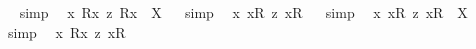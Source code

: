 \begin{isabellebody}
\isadelimproof
\ %
\endisadelimproof
%
\isatagproof
{}\isamarkupfalse%
\ {\isacharparenleft}simp{\isacharparenright}\ \isamarkupfalse%
%
\endisatagproof
{\isafoldproof}%
%
\isadelimproof
%
\endisadelimproof
\isanewline
{}\isamarkupfalse%
\ {\isachardoublequoteopen}{\isasymforall}{\isacharparenleft}{\isasymlambda}x{\isachardot}\ {\isacharless}R{}{\isasymbullet}{\isachardot}x{\isachardot}{\isachargreater}\ {\isasymrightarrow}\isactrlsup z\ {\isacharless}R{}{\isasymbullet}{\isachardot}x{\isachardot}{\isachargreater}{\isacharparenright}\ {\isacharequal}\ X{\isachardoublequoteclose}%
\isadelimproof
\ %
\endisadelimproof
%
\isatagproof
{}\isamarkupfalse%
\ {\isacharparenleft}simp{\isacharparenright}\ \isamarkupfalse%
%
\endisatagproof
{\isafoldproof}%
%
\isadelimproof
%
\endisadelimproof
\isanewline
\isanewline
{}\isamarkupfalse%
\ {\isachardoublequoteopen}{\isacharbrackleft}{\isasymforall}{\isacharparenleft}{\isasymlambda}x{\isachardot}\ {\isacharless}{\isachardot}x{\isachardot}{\isasymcirc}R{}{\isachargreater}\ {\isasymrightarrow}\isactrlsup z\ {\isacharless}{\isachardot}x{\isachardot}{\isasymcirc}R{}{\isachargreater}{\isacharparenright}{\isacharbrackright}{\isachardoublequoteclose}%
\isadelimproof
\ %
\endisadelimproof
%
\isatagproof
{}\isamarkupfalse%
\ {\isacharparenleft}simp{\isacharparenright}\ \isamarkupfalse%
%
\endisatagproof
{\isafoldproof}%
%
\isadelimproof
%
\endisadelimproof
\isanewline
{}\isamarkupfalse%
\ {\isachardoublequoteopen}{\isasymforall}{\isacharparenleft}{\isasymlambda}x{\isachardot}\ {\isacharless}{\isachardot}x{\isachardot}{\isasymcirc}R{}{\isachargreater}\ {\isasymrightarrow}\isactrlsup z\ {\isacharless}{\isachardot}x{\isachardot}{\isasymcirc}R{}{\isachargreater}{\isacharparenright}\ {\isacharequal}\ X{\isachardoublequoteclose}%
\isadelimproof
\ %
\endisadelimproof
%
\isatagproof
{}\isamarkupfalse%
\ {\isacharparenleft}simp{\isacharparenright}\ \isamarkupfalse%
%
\endisatagproof
{\isafoldproof}%
%
\isadelimproof
%
\endisadelimproof
\isanewline
\isanewline
{}\isamarkupfalse%
\ {\isachardoublequoteopen}{\isacharbrackleft}{\isasymforall}{\isacharparenleft}{\isasymlambda}x{\isachardot}\ {\isacharless}R{}{\isasymbullet}{\isachardot}x{\isachardot}{\isachargreater}\ {\isasymrightarrow}\isactrlsup z\ {\isacharless}{\isachardot}x{\isachardot}{\isasymcirc}R{}{\isachargreater}{\isacharparenright}{\isacharbrackright}{\isachardoublequoteclose}%

\end{isabellebody}

